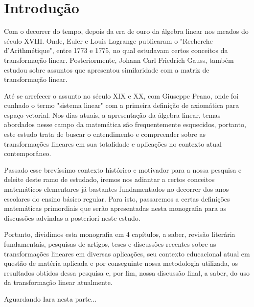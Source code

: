 \chapter{Introdução}
Com o decorrer do tempo, depois da era de ouro da álgebra linear nos meados do século XVIII. Onde, Euler e Louis Lagrange publicaram o "Recherche d'Arithmétique", entre 1773 e 1775, no qual estudavam certos conceitos da transformação linear. Posteriormente, Johann Carl Friedrich Gauss, também estudou sobre assuntos que apresentou similaridade com a matriz de transformação linear.

Até se arrefecer o assunto no século XIX e XX, com Giuseppe Peano, onde foi cunhado o termo "sistema linear" com a primeira definição de axiomática para espaço vetorial. Nos dias atuais, a apresentação da álgebra linear, temas abordados nesse campo da matemática são frequentemente esquecidos, portanto, este estudo trata de buscar o entendimento e compreender sobre as transformações lineares em sua totalidade e aplicações no contexto atual contemporâneo.

Passado esse brevíssimo contexto histórico e motivador para a nossa pesquisa e deleite deste ramo de estudado, iremos nos adiantar a certos conceitos matemáticos elementares já bastantes fundamentados no decorrer dos anos escolares do ensino básico regular. Para isto, passaremos a certas definições matemáticas primordiais que serão apresentadas nesta monografia para as discussões advindas a posteriori neste estudo.

Portanto, dividimos esta monografia em 4 capítulos, a saber, revisão literária fundamentais, pesquisas de artigos, teses e discussões recentes sobre as transformações lineares em diversas aplicações, seu contexto educacional atual em questão de matéria aplicada e por conseguinte nossa metodologia utilizada, os resultados obtidos dessa pesquisa e, por fim, nossa discussão final, a saber, do uso da transformação linear atualmente.

Aguardando Iara nesta parte...